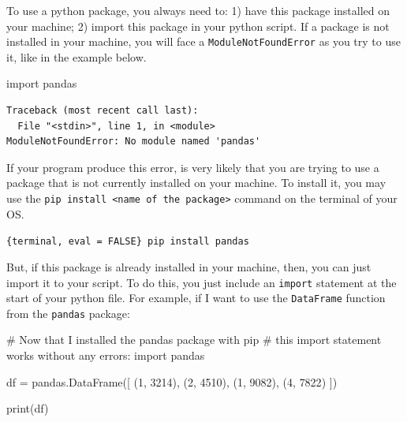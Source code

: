 \documentclass[
  11pt,
  letterpaper,
  DIV=11,
  numbers=noendperiod]{scrreprt}
\newenvironment{Shaded}{\begin{snugshade}}{\end{snugshade}}
\newcommand{\BuiltInTok}[1]{\textcolor[rgb]{0.00,0.23,0.31}{#1}}
\newcommand{\CommentTok}[1]{\textcolor[rgb]{0.37,0.37,0.37}{#1}}
\newcommand{\DecValTok}[1]{\textcolor[rgb]{0.68,0.00,0.00}{#1}}
\newcommand{\ImportTok}[1]{\textcolor[rgb]{0.00,0.46,0.62}{#1}}
\newcommand{\NormalTok}[1]{\textcolor[rgb]{0.00,0.23,0.31}{#1}}
\newcommand{\OperatorTok}[1]{\textcolor[rgb]{0.37,0.37,0.37}{#1}}
\begin{document}
To use a python package, you always need to: 1) have this package
installed on your machine; 2) import this package in your python script.
If a package is not installed in your machine, you will face a
\texttt{ModuleNotFoundError} as you try to use it, like in the example
below.

\begin{Shaded}
\begin{Highlighting}[]
\ImportTok{import}\NormalTok{ pandas}
\end{Highlighting}
\end{Shaded}

\begin{verbatim}
Traceback (most recent call last):
  File "<stdin>", line 1, in <module>
ModuleNotFoundError: No module named 'pandas'
\end{verbatim}

If your program produce this error, is very likely that you are trying
to use a package that is not currently installed on your machine. To
install it, you may use the
\texttt{pip\ install\ \textless{}name\ of\ the\ package\textgreater{}}
command on the terminal of your OS.

\texttt{\{terminal,\ eval\ =\ FALSE\}\ pip\ install\ pandas}

But, if this package is already installed in your machine, then, you can
just import it to your script. To do this, you just include an
\texttt{import} statement at the start of your python file. For example,
if I want to use the \texttt{DataFrame} function from the
\texttt{pandas} package:

\begin{Shaded}
\begin{Highlighting}[]
\CommentTok{\# Now that I installed the \textasciigrave{}pandas\textasciigrave{} package with \textasciigrave{}pip\textasciigrave{}}
\CommentTok{\# this \textasciigrave{}import\textasciigrave{} statement works without any errors:}
\ImportTok{import}\NormalTok{ pandas}

\NormalTok{df }\OperatorTok{=}\NormalTok{ pandas.DataFrame([}
\NormalTok{  (}\DecValTok{1}\NormalTok{, }\DecValTok{3214}\NormalTok{), (}\DecValTok{2}\NormalTok{, }\DecValTok{4510}\NormalTok{), }
\NormalTok{  (}\DecValTok{1}\NormalTok{, }\DecValTok{9082}\NormalTok{), (}\DecValTok{4}\NormalTok{, }\DecValTok{7822}\NormalTok{)}
\NormalTok{])}

\BuiltInTok{print}\NormalTok{(df)}
\end{Highlighting}
\end{Shaded}
\end{document}

